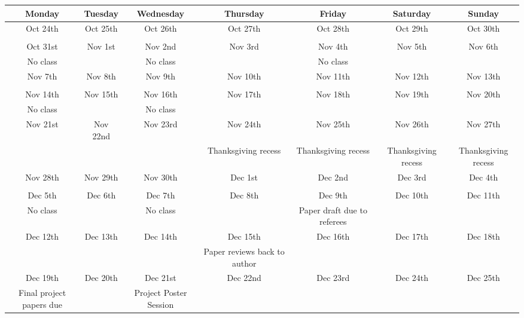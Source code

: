 \documentclass[10pt]{article}
\begin{document}
\begin{center}
	\begin{adjustbox}{width=1\textwidth}
	\def\arraystretch{1.5}
	\begin{tabular}{c |c |c |c | c | c | c}
		\hline
		Monday & Tuesday & Wednesday & Thursday & Friday & Saturday & Sunday \\
		\hline \hline
		Oct 24th & Oct 25th & Oct 26th & Oct 27th & Oct 28th & Oct 29th & Oct 30th \\ 
		 &  &  &  &  &  &  \\ \hline
		Oct 31st & Nov 1st & Nov 2nd & Nov 3rd & Nov 4th & Nov 5th & Nov 6th \\
		No class &  & No class &  & No class &  &  \\ \hline
		Nov 7th & Nov 8th & Nov 9th & Nov 10th & Nov 11th & Nov 12th & Nov 13th \\
		 &  &  &  &  &  &  \\ \hline
		Nov 14th & Nov 15th & Nov 16th & Nov 17th & Nov 18th & Nov 19th & Nov 20th \\ 
		No class &  & No class &  &  &  &  \\ \hline
		Nov 21st & Nov 22nd & Nov 23rd & Nov 24th & Nov 25th & Nov 26th & Nov 27th \\ 
		 &  &  & Thanksgiving recess & Thanksgiving recess & Thanksgiving recess & Thanksgiving recess \\ \hline
		Nov 28th & Nov 29th & Nov 30th & Dec 1st & Dec 2nd & Dec 3rd & Dec 4th \\ 
		 &  &  &  &  &  &  \\ \hline
		Dec 5th & Dec 6th & Dec 7th & Dec 8th & Dec 9th & Dec 10th & Dec 11th \\ 
		No class &  & No class&  & Paper draft due to referees &  &  \\ \hline
		Dec 12th & Dec 13th & Dec 14th & Dec 15th & Dec 16th & Dec 17th & Dec 18th \\ 
		 &  &  & Paper reviews back to author &  &  &  \\ \hline
		Dec 19th & Dec 20th & Dec 21st & Dec 22nd & Dec 23rd & Dec 24th & Dec 25th \\
		Final project papers due &  & Project Poster Session &  &  &  & \\ \hline
	\end{tabular}
	\end{adjustbox}
\end{center}
\end{document}
